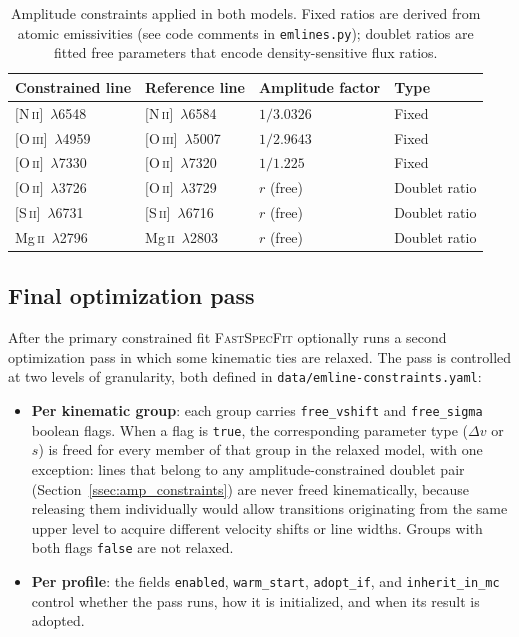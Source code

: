 \documentclass[12pt]{article}
\begin{document}
\begin{table}[h]
\centering
\renewcommand{\arraystretch}{1.5}
\begin{tabular}{@{}llll@{}}
\toprule
Constrained line & Reference line & Amplitude factor & Type \\
\midrule
$[$N\,\textsc{ii}$]$~$\lambda$6548  & $[$N\,\textsc{ii}$]$~$\lambda$6584  & $1/3.0326$ & Fixed \\
$[$O\,\textsc{iii}$]$~$\lambda$4959 & $[$O\,\textsc{iii}$]$~$\lambda$5007 & $1/2.9643$ & Fixed \\
$[$O\,\textsc{ii}$]$~$\lambda$7330  & $[$O\,\textsc{ii}$]$~$\lambda$7320  & $1/1.225$  & Fixed \\
$[$O\,\textsc{ii}$]$~$\lambda$3726  & $[$O\,\textsc{ii}$]$~$\lambda$3729  & $r$ (free) & Doublet ratio \\
$[$S\,\textsc{ii}$]$~$\lambda$6731  & $[$S\,\textsc{ii}$]$~$\lambda$6716  & $r$ (free) & Doublet ratio \\
Mg\,\textsc{ii}~$\lambda$2796        & Mg\,\textsc{ii}~$\lambda$2803       & $r$ (free) & Doublet ratio \\
\bottomrule
\end{tabular}
\caption{Amplitude constraints applied in both models.  Fixed ratios are derived
  from atomic emissivities (see code comments in \texttt{emlines.py}); doublet
  ratios are fitted free parameters that encode density-sensitive flux ratios.}
\label{tab:amp_constraints}
\end{table}


\subsection{Final optimization pass}
\label{ssec:final_pass}

After the primary constrained fit \textsc{FastSpecFit} optionally runs a second
optimization pass in which some kinematic ties are relaxed.  The pass is controlled at
two levels of granularity, both defined in \texttt{data/emline-constraints.yaml}:

\begin{itemize}
\item \textbf{Per kinematic group}: each group carries \texttt{free\_vshift} and
  \texttt{free\_sigma} boolean flags.  When a flag is \texttt{true}, the corresponding
  parameter type ($\Delta v$ or $s$) is freed for every member of that group in the
  relaxed model, with one exception: lines that belong to any amplitude-constrained
  doublet pair (Section~\ref{ssec:amp_constraints}) are never freed kinematically,
  because releasing them individually would allow transitions originating from the same
  upper level to acquire different velocity shifts or line widths.  Groups with both
  flags \texttt{false} are not relaxed.

\item \textbf{Per profile}: the fields \texttt{enabled}, \texttt{warm\_start},
  \texttt{adopt\_if}, and \texttt{inherit\_in\_mc} control whether the pass runs,
  how it is initialized, and when its result is adopted.
\end{itemize}
\end{document}
